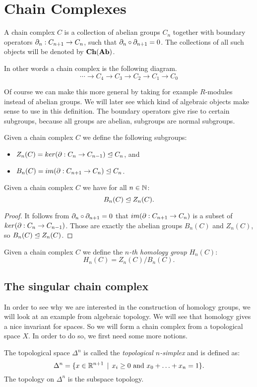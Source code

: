 \section{Chain Complexes}
\label{sec:Chain Complexes}
\begin{definition}
	A chain complex $C$ is a collection of abelian groups $C_n$ together with boundary operators $\partial_n: C_{n+1} \to C_n$, such that $\partial_n \circ \partial_{n+1} = 0$. The collections of all such objects will be denoted by $\mathbf{Ch}(\mathbf{Ab})$.
\end{definition}

In other words a chain complex is the following diagram.
$$ \cdots \to C_4 \to C_3 \to C_2 \to C_1 \to C_0 $$

Of course we can make this more general by taking for example $R$-modules instead of abelian groups. We will later see which kind of algebraic objects make sense to use in this definition. The boundary operators give rise to certain subgroups, because all groups are abelian, subgroups are normal subgroups.

\begin{definition}
	Given a chain complex $C$ we define the following subgroups:
	\begin{itemize}
		\item $Z_n(C) = ker(\partial: C_n \to C_{n-1}) \trianglelefteq C_n$, and
		\item $B_n(C) = im(\partial: C_{n+1} \to C_n) \trianglelefteq C_n$.
	\end{itemize}
\end{definition}
\begin{lemma}
	Given a chain complex $C$ we have for all $n \in \mathbb{N}$:
	$$ B_n(C) \trianglelefteq Z_n(C).$$
\end{lemma}
\begin{proof}
	It follows from $\partial_n \circ \partial_{n+1} = 0$ that $im(\partial: C_{n+1} \to C_n)$ is a subset of $ker(\partial: C_n \to C_{n-1})$. Those are exactly the abelian groups $B_n(C)$ and $Z_n(C)$, so $ B_n(C) \trianglelefteq Z_n(C) $.
\end{proof}
\begin{definition}
	Given a chain complex $C$ we define the \emph{$n$-th homology group} $H_n(C)$:
	$$ H_n(C) = Z_n(C) / B_n(C).$$
\end{definition}

\subsection{The singular chain complex}
In order to see why we are interested in the construction of homology groups, we will look at an example from algebraic topology. We will see that homology gives a nice invariant for spaces. So we will form a chain complex from a topological space $X$. In order to do so, we first need some more notions.
\begin{definition}
	The topological space $\Delta^n$ is called the \emph{topological $n$-simplex} and is defined as:
	$$ \Delta^n = \{x \in \mathbb{R}^{n+1} \,\mid\, x_i \geq 0 \text{ and } x_0 + \ldots + x_n = 1 \}.$$
	The topology on $\Delta^n$ is the subspace topology.
\end{definition}

